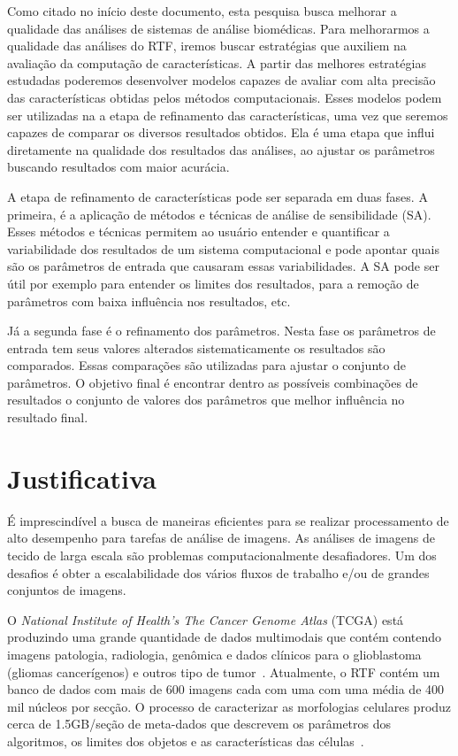 \documentclass[a4paper,10pt]{article}
\begin{document}
Como citado no início deste documento, esta pesquisa busca melhorar a qualidade das análises de sistemas de análise biomédicas. Para melhorarmos a qualidade das análises do RTF, iremos buscar estratégias que auxiliem na avaliação da computação de características. A partir das melhores estratégias estudadas poderemos desenvolver modelos capazes de avaliar com alta precisão das características obtidas pelos métodos computacionais. Esses modelos podem ser utilizadas na a etapa de refinamento das características, uma vez que seremos capazes de comparar os diversos resultados obtidos. Ela é uma etapa que influi diretamente na qualidade dos resultados das análises, ao ajustar os parâmetros buscando resultados com maior acurácia.

A etapa de refinamento de características pode ser separada em duas fases. A primeira, é a aplicação de métodos e técnicas de análise de sensibilidade (SA). Esses métodos e técnicas permitem ao usuário entender e quantificar a variabilidade dos resultados de um sistema computacional e pode apontar quais são os parâmetros de entrada que causaram essas variabilidades. A SA pode ser útil por exemplo para entender os limites dos resultados, para a remoção de parâmetros com baixa influência nos resultados, etc.

Já a segunda fase é o refinamento dos parâmetros. Nesta fase os parâmetros de entrada tem seus valores alterados sistematicamente os resultados são comparados. Essas comparações são utilizadas para ajustar o conjunto de parâmetros. O objetivo final é encontrar dentro as possíveis combinações de resultados o conjunto de valores dos parâmetros que melhor influência no resultado final.


\section{Justificativa}

É imprescindível a busca de maneiras eficientes para se realizar processamento de alto desempenho para tarefas de análise de imagens. As análises de imagens de tecido de larga escala são problemas computacionalmente desafiadores. Um dos desafios é obter a escalabilidade dos vários fluxos de trabalho e/ou de grandes conjuntos de imagens. 

O \textit{National Institute of Health’s The Cancer Genome Atlas} (TCGA) está produzindo uma grande quantidade de dados multimodais que contém contendo imagens patologia, radiologia, genômica e dados clínicos para o glioblastoma (gliomas cancerígenos) e outros tipo de tumor~\cite{mclendon2008comprehensive}. Atualmente, o RTF contém um banco de dados com mais de 600 imagens cada com uma com uma média de 400 mil núcleos por secção. O processo de caracterizar as morfologias celulares produz cerca de 1.5GB/seção de meta-dados que descrevem os parâmetros dos algoritmos, os limites dos objetos e as características das células~\cite{cooper2011morphological}.
\end{document}
